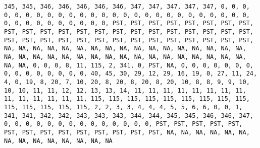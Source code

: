 \documentclass[]{article}
\begin{document}
\begin{verbatim}
345, 345, 346, 346, 346, 346, 346, 347, 347, 347, 347, 347, 0, 0, 0, 0, 0, 0, 0, 0, 0, 0, 0, 0, 0, 0, 0, 0, 0, 0, 0, 0, 0, 0, 0, 0, 0, 0, 0, 0, 0, 0, 0, 0, 0, 0, 0, 0, PST, PST, PST, PST, PST, PST, PST, PST, PST, PST, PST, PST, PST, PST, PST, PST, PST, PST, PST, PST, PST, PST, PST, PST, PST, PST, PST, PST, PST, PST, PST, PST, PST, PST, PST, PST, NA, NA, NA, NA, NA, NA, NA, NA, NA, NA, NA, NA, NA, NA, NA, NA, NA, NA, NA, NA, NA, NA, NA, NA, NA, NA, NA, NA, NA, NA, NA, NA, NA, NA, NA, NA, 0, 0, 0, 8, 11, 115, 2, 341, 0, PST, NA, 0, 0, 0, 0, 0, 0, 0, 0, 0, 0, 0, 0, 0, 0, 0, 40, 45, 30, 29, 12, 29, 16, 19, 0, 27, 11, 24, 4, 0, 19, 8, 20, 7, 10, 20, 8, 20, 8, 20, 8, 20, 10, 8, 8, 9, 9, 10, 10, 10, 11, 11, 12, 12, 13, 13, 14, 11, 11, 11, 11, 11, 11, 11, 11, 11, 11, 11, 11, 11, 11, 115, 115, 115, 115, 115, 115, 115, 115, 115, 115, 115, 115, 115, 115, 2, 2, 3, 3, 4, 4, 4, 5, 5, 6, 6, 0, 0, 1, 341, 341, 342, 342, 343, 343, 343, 344, 344, 345, 345, 346, 346, 347, 0, 0, 0, 0, 0, 0, 0, 0, 0, 0, 0, 0, 0, 0, PST, PST, PST, PST, PST, PST, PST, PST, PST, PST, PST, PST, PST, PST, NA, NA, NA, NA, NA, NA, NA, NA, NA, NA, NA, NA, NA, NA

\end{verbatim}
\end{document}
